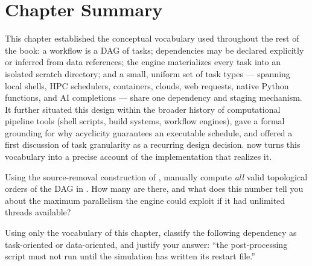 \section{Chapter Summary}

This chapter established the conceptual vocabulary used throughout the rest
of the book: a workflow is a DAG of tasks; dependencies may be declared
explicitly or inferred from data references; the engine materializes every
task into an isolated scratch directory; and a small, uniform set of task
types --- spanning local shells, HPC schedulers, containers, clouds, web
requests, native Python functions, and AI completions --- share one
dependency and staging mechanism. It further situated this design within the
broader history of computational pipeline tools (shell scripts, build
systems, workflow engines), gave a formal grounding for why acyclicity
guarantees an executable schedule, and offered a first discussion of task
granularity as a recurring design decision.  now turns
this vocabulary into a precise account of the implementation that realizes
it.

\begin{exercise}
Using the source-removal construction of ,
manually compute \emph{all} valid topological orders of the DAG in
. How many are there, and what does this number tell you
about the maximum parallelism the engine could exploit if it had unlimited
threads available?
\end{exercise}

\begin{exercise}
Using only the vocabulary of this chapter, classify the following dependency
as task-oriented or data-oriented, and justify your answer: ``the
post-processing script must not run until the simulation has written its
restart file.''
\end{exercise}

